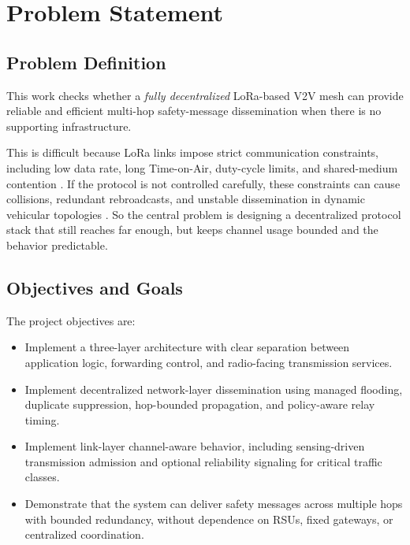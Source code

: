\section{Problem Statement}

\subsection{Problem Definition}

This work checks whether a \textit{fully decentralized} LoRa-based V2V mesh can provide reliable and efficient
multi-hop safety-message dissemination when there is no supporting infrastructure.

This is difficult because LoRa links impose strict communication constraints, including low data rate, long
Time-on-Air, duty-cycle limits, and shared-medium contention \cite{lora_mesh_iot,routing_mesh_2020}. If the
protocol is not controlled carefully, these constraints can cause collisions, redundant rebroadcasts, and
unstable dissemination in dynamic vehicular topologies \cite{vdtn_routing_eval,lora_mesh_emergency}. So the
central problem is designing a decentralized protocol stack that still reaches far enough, but keeps channel
usage bounded and the behavior predictable.

\subsection{Objectives and Goals}

The project objectives are:

\begin{itemize}
	\item Implement a three-layer architecture with clear separation between application logic, forwarding control,
	and radio-facing transmission services.
	\item Implement decentralized network-layer dissemination using managed flooding, duplicate suppression,
	hop-bounded propagation, and policy-aware relay timing.
	\item Implement link-layer channel-aware behavior, including sensing-driven transmission admission and
	optional reliability signaling for critical traffic classes.
	\item Demonstrate that the system can deliver safety messages across multiple hops with bounded redundancy,
	without dependence on RSUs, fixed gateways, or centralized coordination.
\end{itemize}

